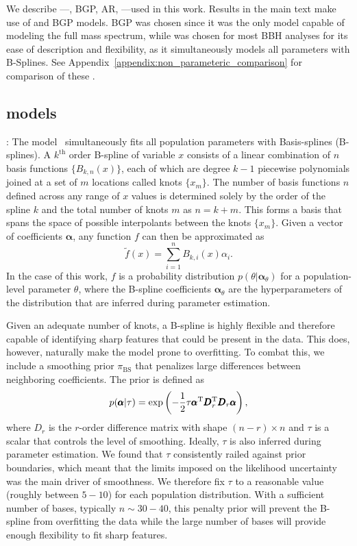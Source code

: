 We describe \nonparametrics---\BSpline, \ac{BGP}, \ac{AR}, \vamana---used in this work. Results in the main text make use of \BSpline and \ac{BGP} models. \ac{BGP} was chosen since it was the only model capable of modeling the full mass spectrum, while \BSpline was chosen for most \ac{BBH} analyses for its ease of description and flexibility, as it simultaneously models all parameters with B-Splines. See Appendix~\ref{appendix:non_parameteric_comparison} for comparison of these \nonparametrics.
\subsection{\BSpline models} \label{appendix:BSpline}

\BSpline: The \BSpline model~\citep{Edelman:2022ydv} simultaneously fits all population parameters with Basis-splines (B-splines). 
A $k^\mathrm{th}$ order B-spline of variable $x$ consists of a linear combination of $n$ basis functions $\{B_{k,n}(x)\}$, each of which are degree $k-1$ piecewise polynomials joined at a set of $m$ locations called knots $\{x_m\}$. 
The number of basis functions $n$ defined across any range of $x$ values is determined solely by the order of the spline $k$ and the total number of knots $m$ as $n = k + m$.
This forms a basis that spans the space of possible interpolants between the knots $\{x_m\}$. Given a vector of coefficients $\pmb{\alpha}$, any function $f$ can then be approximated as 
\begin{equation}
\tilde{f}(x) = \sum^n_{i=1} B_{k,i}(x) \alpha_i.
\label{eqn:basis_splines}
\end{equation}
In the case of this work, $f$ is a probability distribution $p(\theta|\pmb{\alpha}_\theta)$ for a population-level parameter $\theta$, where the B-spline coefficients $\pmb{\alpha}_\theta$ are the hyperparameters of the distribution that are inferred during parameter estimation. 

Given an adequate number of knots, a B-spline is highly flexible and therefore capable of identifying sharp features that could be present in the data. 
This does, however, naturally make the \BSpline model prone to overfitting. 
To combat this, we include a smoothing prior $\pi_\text{BS}$ that penalizes large differences between neighboring coefficients. 
The prior is defined as 
\begin{equation}
p(\pmb{\alpha}|\tau) = \text{exp}\left( -\frac{1}{2} \tau \pmb{\alpha}^{\rm T} \pmb{D}_r^{\rm T} \pmb{D}_r\pmb{\alpha}\right),
\end{equation}
where $D_r$ is the $r$-order difference matrix with shape $(n - r) \times n$ and $\tau$ is a scalar that controls the level of smoothing. 
Ideally, $\tau$ is also inferred during parameter estimation. We found that $\tau$ consistently railed against prior boundaries, which meant that the limits imposed on the likelihood uncertainty was the main driver of smoothness. We therefore fix $\tau$ to a reasonable value (roughly between $5{-}10$) for each population distribution. 
With a sufficient number of bases, typically $n \sim 30{-}40$, this penalty prior will prevent the B-spline from overfitting the data while the large number of bases will provide enough flexibility to fit sharp features. 

